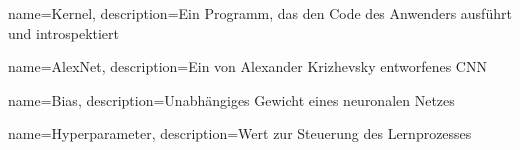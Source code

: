 
%
%

%
%

	{name={Kernel}, 
	description={Ein Programm, das den Code des Anwenders ausführt und introspektiert}
	}
	
	{name={AlexNet}, 
	description={Ein von Alexander Krizhevsky entworfenes \ac{CNN}}
	}

	{name={Bias}, 
	description={Unabhängiges Gewicht eines neuronalen Netzes}
	}
	
	{name={Hyperparameter},
	description={Wert zur Steuerung des Lernprozesses}
	}
